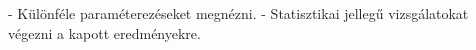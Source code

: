 
- Különféle paraméterezéseket megnézni.
- Statisztikai jellegű vizsgálatokat végezni a kapott eredményekre.
